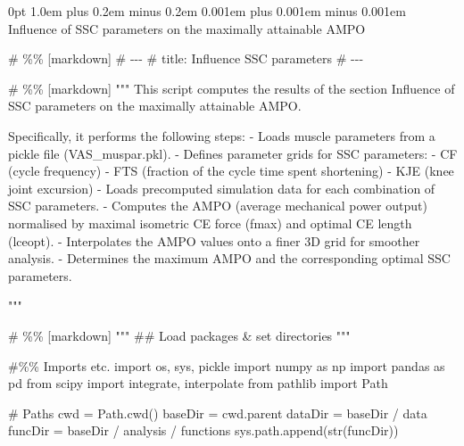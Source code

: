 \documentclass[
  11pt,
  a4paper]{article}
\makeatletter
\newenvironment{Shaded}{\begin{snugshade}}{\end{snugshade}}
\newcommand{\BuiltInTok}[1]{\textcolor[rgb]{0.00,0.23,0.31}{#1}}
\newcommand{\CommentTok}[1]{\textcolor[rgb]{0.37,0.37,0.37}{#1}}
\newcommand{\ImportTok}[1]{\textcolor[rgb]{0.00,0.46,0.62}{#1}}
\newcommand{\NormalTok}[1]{\textcolor[rgb]{0.00,0.23,0.31}{#1}}
\newcommand{\OperatorTok}[1]{\textcolor[rgb]{0.37,0.37,0.37}{#1}}
\newcommand{\StringTok}[1]{\textcolor[rgb]{0.13,0.47,0.30}{#1}}
\renewcommand{\subsection}{%
  \@startsection{subsection}{2}
    {0pt} 					%
    {1.0em plus 0.2em minus 0.2em} 	%
    {0.001em plus 0.001em minus 0.001em}    	%
    {\large\bfseries\sffamily}%
}
\makeatother
\begin{document}
\subsection{Influence of SSC parameters on the maximally attainable
AMPO}\label{influence-of-ssc-parameters-on-the-maximally-attainable-ampo}

\begin{Shaded}
\begin{Highlighting}[]
\CommentTok{\# \%\% [markdown]}
\CommentTok{\# {-}{-}{-}}
\CommentTok{\# title: Influence SSC parameters}
\CommentTok{\# {-}{-}{-}}

\CommentTok{\# \%\% [markdown]}
\CommentTok{"""}
\CommentTok{This script computes the results of the section \textquotesingle{}Influence of SSC parameters }
\CommentTok{on the maximally attainable AMPO\textquotesingle{}. }

\CommentTok{Specifically, it performs the following steps:}
\CommentTok{    }
\CommentTok{{-}   Loads muscle parameters from a pickle file (\textasciigrave{}VAS\_muspar.pkl\textasciigrave{}).}
\CommentTok{{-}   Defines parameter grids for SSC parameters: }
\CommentTok{    {-}   CF (cycle frequency)}
\CommentTok{    {-}   FTS (fraction of the cycle time spent shortening)}
\CommentTok{    {-}   KJE (knee joint excursion)}
\CommentTok{{-}   Loads precomputed simulation data for each combination of SSC parameters.}
\CommentTok{{-}   Computes the AMPO (average mechanical power output) normalised by }
\CommentTok{    maximal isometric CE force (fmax) and optimal CE length (lceopt).}
\CommentTok{{-}   Interpolates the AMPO values onto a finer 3D grid for smoother analysis.}
\CommentTok{{-}   Determines the maximum AMPO and the corresponding optimal SSC parameters.}

\CommentTok{"""}

\CommentTok{\# \%\% [markdown]}
\CommentTok{"""}
\CommentTok{\#\# Load packages \& set directories}
\CommentTok{"""}

\CommentTok{\#\%\% Imports etc.}
\ImportTok{import}\NormalTok{ os, sys, pickle}
\ImportTok{import}\NormalTok{ numpy }\ImportTok{as}\NormalTok{ np}
\ImportTok{import}\NormalTok{ pandas }\ImportTok{as}\NormalTok{ pd}
\ImportTok{from}\NormalTok{ scipy }\ImportTok{import}\NormalTok{ integrate, interpolate}
\ImportTok{from}\NormalTok{ pathlib }\ImportTok{import}\NormalTok{ Path}

\CommentTok{\# Paths}
\NormalTok{cwd }\OperatorTok{=}\NormalTok{ Path.cwd()}
\NormalTok{baseDir }\OperatorTok{=}\NormalTok{ cwd.parent}
\NormalTok{dataDir }\OperatorTok{=}\NormalTok{ baseDir }\OperatorTok{/} \StringTok{\textquotesingle{}data\textquotesingle{}}
\NormalTok{funcDir }\OperatorTok{=}\NormalTok{ baseDir }\OperatorTok{/} \StringTok{\textquotesingle{}analysis\textquotesingle{}} \OperatorTok{/} \StringTok{\textquotesingle{}functions\textquotesingle{}}
\NormalTok{sys.path.append(}\BuiltInTok{str}\NormalTok{(funcDir))}


\end{Highlighting}
\end{Shaded}
\end{document}
